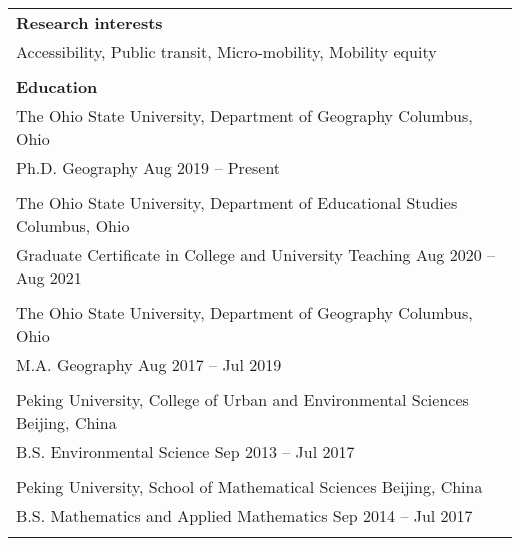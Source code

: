 \documentclass[letterpaper, 11pt]{article}
\begin{document}
\begin{longtable}{p{6.5in}}

\nohyphens{\textbf{Research interests}} \\
Accessibility, Public transit, Micro-mobility, Mobility equity \\
\\


\textbf{Education} 
\\ The Ohio State University, Department of Geography \hfill Columbus, Ohio \\
Ph.D. Geography \hfill Aug 2019 -- Present \\

\\ The Ohio State University, Department of Educational Studies \hfill Columbus, Ohio \\
Graduate Certificate in College and University Teaching \hfill Aug 2020 -- Aug 2021 \\

\\ The Ohio State University, Department of Geography \hfill Columbus, Ohio \\
M.A. Geography \hfill Aug 2017 -- Jul 2019 \\

\\ Peking University, College of Urban and Environmental Sciences \hfill Beijing, China \\
B.S. Environmental Science \hfill Sep 2013 -- Jul 2017 \\

\\ Peking University, School of Mathematical Sciences \hfill Beijing, China \\
B.S. Mathematics and Applied Mathematics \hfill Sep 2014 -- Jul 2017 \\ \\



\end{longtable}
\end{document}
